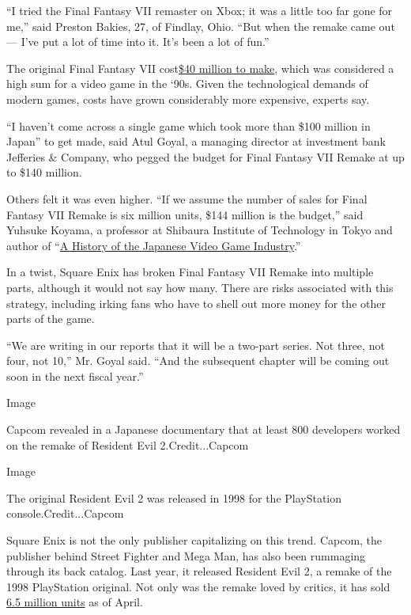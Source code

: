 ``I tried the Final Fantasy VII remaster on Xbox; it was a little too
far gone for me,'' said Preston Bakies, 27, of Findlay, Ohio. ``But when
the remake came out --- I've put a lot of time into it. It's been a lot
of fun.''

The original Final Fantasy VII
cost\href{https://www.polygon.com/a/final-fantasy-7}{\$40 million to
make}, which was considered a high sum for a video game in the `90s.
Given the technological demands of modern games, costs have grown
considerably more expensive, experts say.

``I haven't come across a single game which took more than \$100 million
in Japan'' to get made, said Atul Goyal, a managing director at
investment bank Jefferies \& Company, who pegged the budget for Final
Fantasy VII Remake at up to \$140 million.

Others felt it was even higher. ``If we assume the number of sales for
Final Fantasy VII Remake is six million units, \$144 million is the
budget,'' said Yuhsuke Koyama, a professor at Shibaura Institute of
Technology in Tokyo and author of
``\href{https://www.amazon.co.jp/dp/4409241079/ref=cm_sw_r_tw_dp_U_x_NWONEbES7SRZ9}{A
History of the Japanese Video Game Industry}.''

In a twist, Square Enix has broken Final Fantasy VII Remake into
multiple parts, although it would not say how many. There are risks
associated with this strategy, including irking fans who have to shell
out more money for the other parts of the game.

``We are writing in our reports that it will be a two-part series. Not
three, not four, not 10,'' Mr. Goyal said. ``And the subsequent chapter
will be coming out soon in the next fiscal year.''

Image

Capcom revealed in a Japanese documentary that at least 800 developers
worked on the remake of Resident Evil 2.Credit...Capcom

Image

The original Resident Evil 2 was released in 1998 for the PlayStation
console.Credit...Capcom

Square Enix is not the only publisher capitalizing on this trend.
Capcom, the publisher behind Street Fighter and Mega Man, has also been
rummaging through its back catalog. Last year, it released Resident Evil
2, a remake of the 1998 PlayStation original. Not only was the remake
loved by critics, it has sold
\href{http://www.capcom.co.jp/ir/english/news/html/e200413.html}{6.5
million units} as of April.

